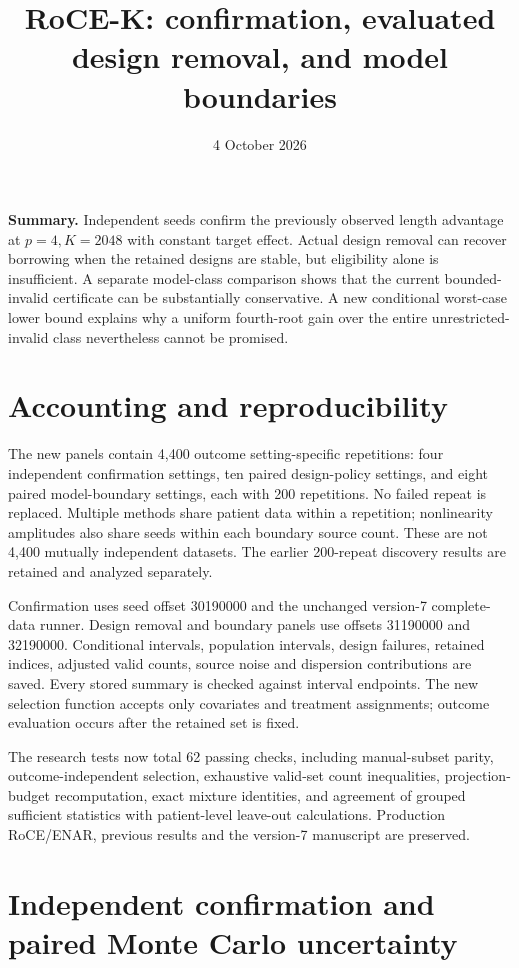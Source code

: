 \documentclass[11pt]{article}
\title{RoCE-K: confirmation, evaluated design removal, and model boundaries}
\author{}\date{4 October 2026}
\begin{document}
\maketitle

\textbf{Summary.} Independent seeds confirm the previously observed length
advantage at $p=4,K=2048$ with constant target effect. Actual design removal
can recover borrowing when the retained designs are stable, but eligibility
alone is insufficient. A separate model-class comparison shows that the
current bounded-invalid certificate can be substantially conservative. A new
conditional worst-case lower bound explains why a uniform fourth-root gain
over the entire unrestricted-invalid class nevertheless cannot be promised.

\section{Accounting and reproducibility}

The new panels contain 4,400 outcome setting-specific repetitions: four
independent confirmation settings, ten paired design-policy settings, and
eight paired model-boundary settings, each with 200 repetitions. No failed
repeat is replaced. Multiple methods share patient data within a repetition;
nonlinearity amplitudes also share seeds within each boundary source count.
These are not 4,400 mutually independent datasets. The earlier 200-repeat
discovery results are retained and analyzed separately.

Confirmation uses seed offset 30190000 and the unchanged version-7 complete-data
runner. Design removal and boundary panels use offsets 31190000 and 32190000.
Conditional intervals, population intervals, design failures, retained indices,
adjusted valid counts, source noise and dispersion contributions are saved.
Every stored summary is checked against interval endpoints. The new selection
function accepts only covariates and treatment assignments; outcome evaluation
occurs after the retained set is fixed.

The research tests now total 62 passing checks, including manual-subset parity,
outcome-independent selection, exhaustive valid-set count inequalities,
projection-budget recomputation, exact mixture identities, and agreement of
grouped sufficient statistics with patient-level leave-out calculations.
Production RoCE/ENAR, previous results and the version-7 manuscript are preserved.

\section{Independent confirmation and paired Monte Carlo uncertainty}
\end{document}
